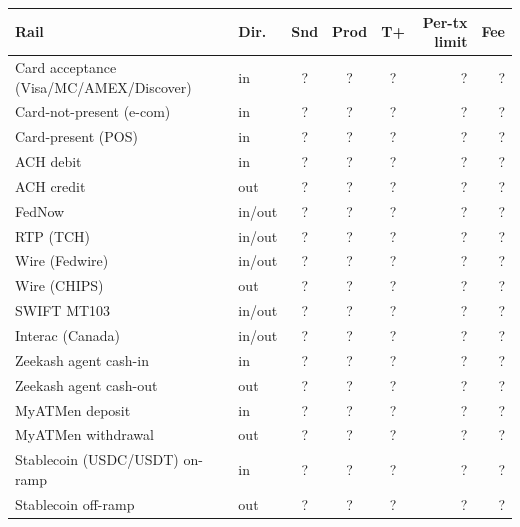 \documentclass[11pt,letterpaper]{article}
\begin{document}
\begin{tabularx}{\linewidth}{Y l c c c r r}
\toprule
\textbf{Rail} & \textbf{Dir.} & \textbf{Snd} & \textbf{Prod} &
\textbf{T+} & \textbf{Per-tx limit} & \textbf{Fee} \\
\midrule
Card acceptance (Visa/MC/AMEX/Discover) & in    & ? & ? & ? & ? & ? \\
Card-not-present (e-com)                & in    & ? & ? & ? & ? & ? \\
Card-present (POS)                      & in    & ? & ? & ? & ? & ? \\
ACH debit                               & in    & ? & ? & ? & ? & ? \\
ACH credit                              & out   & ? & ? & ? & ? & ? \\
FedNow                                  & in/out & ? & ? & ? & ? & ? \\
RTP (TCH)                               & in/out & ? & ? & ? & ? & ? \\
Wire (Fedwire)                          & in/out & ? & ? & ? & ? & ? \\
Wire (CHIPS)                            & out   & ? & ? & ? & ? & ? \\
SWIFT MT103                             & in/out & ? & ? & ? & ? & ? \\
Interac (Canada)                        & in/out & ? & ? & ? & ? & ? \\
Zeekash agent cash-in                   & in    & ? & ? & ? & ? & ? \\
Zeekash agent cash-out                  & out   & ? & ? & ? & ? & ? \\
MyATMen deposit                         & in    & ? & ? & ? & ? & ? \\
MyATMen withdrawal                      & out   & ? & ? & ? & ? & ? \\
Stablecoin (USDC/USDT) on-ramp          & in    & ? & ? & ? & ? & ? \\
Stablecoin off-ramp                     & out   & ? & ? & ? & ? & ? \\
\bottomrule
\end{tabularx}
\end{document}
